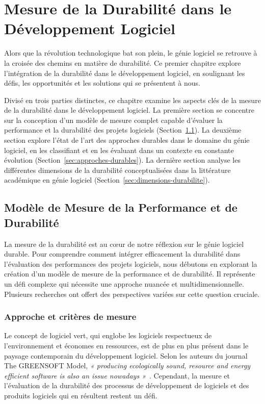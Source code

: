 \chapter{Mesure de la Durabilité dans le Développement Logiciel}	%
\label{mesure}

Alors que la révolution technologique bat son plein, le génie logiciel se retrouve à la croisée des chemins en matière de durabilité. Ce premier chapitre explore l'intégration de la durabilité dans le développement logiciel, en soulignant les défis, les opportunités et les solutions qui se présentent à nous.


Divisé en trois parties distinctes, ce chapitre examine les aspects clés de la mesure de la durabilité dans le développement logiciel. La première section se concentre sur la conception d'un modèle de mesure complet capable d'évaluer la performance et la durabilité des projets logiciels (Section~\ref{sec:mesure-durabilite}). La deuxième section explore l'état de l'art des approches durables dans le domaine du génie logiciel, en les classifiant et en les évaluant dans un contexte en constante évolution (Section~\ref{sec:approches-durables}). La dernière section analyse les différentes dimensions de la durabilité conceptualisées dans la littérature académique en génie logiciel (Section~\ref{sec:dimensions-durabilite}).


\section{Modèle de Mesure de la Performance et de Durabilité}\label{sec:mesure-durabilite}


La mesure de la durabilité est au cœur de notre réflexion sur le génie logiciel durable. 
Pour comprendre comment intégrer efficacement la durabilité dans l'évaluation des performances des projets logiciels, nous débutons en explorant la création d'un modèle de mesure de la performance et de durabilité. Il représente un défi complexe qui nécessite une approche nuancée et multidimensionnelle. 
Plusieurs recherches ont offert des perspectives variées sur cette question cruciale.

\subsection{Approche et critères de mesure}
Le concept de logiciel vert, qui englobe les logiciels respectueux de l'environnement et économes en ressources, est de plus en plus présent dans le paysage contemporain du développement logiciel. Selon les auteurs du journal The GREENSOFT Model, \emph{« producing ecologically sound, resource and energy efficient software is also an issue nowadays »}~\cite{GreenSoftModel}. Cependant, la mesure et l'évaluation de la durabilité des processus de développement de logiciels et des produits logiciels qui en résultent restent un défi.


